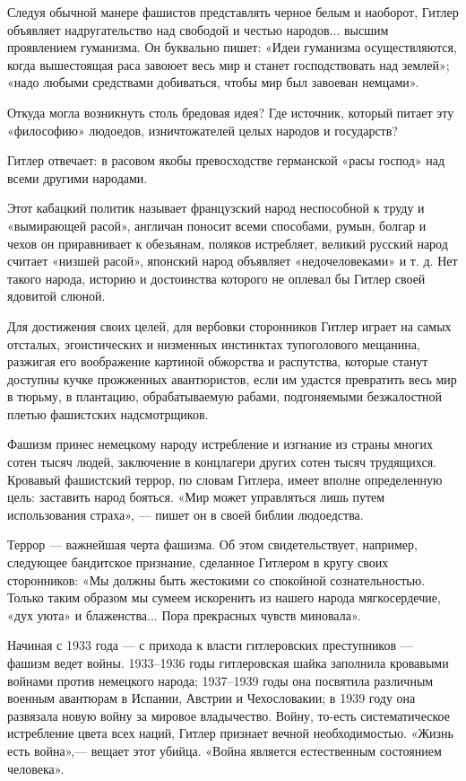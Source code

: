 \documentclass[12pt, a4paper, openany]{book}
\begin{document}
Следуя обычной манере фашистов представлять черное белым и наоборот, Гитлер объявляет надругательство над свободой и честью народов... высшим проявлением гуманизма. Он буквально пишет: «Идеи гуманизма осуществляются, когда вышестоящая раса завоюет весь мир и станет господствовать над землей»; «надо любыми средствами добиваться, чтобы мир был завоеван немцами».

Откуда могла возникнуть столь бредовая идея? Где источник, который питает эту «философию» людоедов, изничтожателей целых народов и государств?

Гитлер отвечает: в расовом якобы превосходстве германской «расы господ» над всеми другими народами.

Этот кабацкий политик называет французский народ неспособной к труду и «вымирающей расой», англичан поносит всеми способами, румын, болгар и чехов он приравнивает к обезьянам, поляков истребляет, великий русский народ считает «низшей расой», японский народ объявляет «недочеловеками» и т. д. Нет такого народа, историю и достоинства которого не оплевал бы Гитлер своей ядовитой слюной.
	
Для достижения своих целей, для вербовки сторонников Гитлер играет на самых отсталых, эгоистических и низменных инстинктах тупоголового мещанина, разжигая его воображение картиной обжорства и распутства, которые станут доступны кучке прожженных авантюристов, если им удастся превратить весь мир в тюрьму, в плантацию, обрабатываемую рабами, подгоняемыми безжалостной плетью фашистских надсмотрщиков.

Фашизм принес немецкому народу истребление и изгнание из страны многих сотен тысяч людей, заключение в концлагери других сотен тысяч трудящихся. Кровавый фашистский террор, по словам Гитлера, имеет вполне определенную цель: заставить народ бояться. «Мир может управляться лишь путем использования страха», — пишет он в своей библии людоедства.

Террор — важнейшая черта фашизма. Об этом свидетельствует, например, следующее бандитское признание, сделанное Гитлером в кругу своих сторонников: «Мы должны быть жестокими со спокойной сознательностью. Только таким образом мы сумеем искоренить из нашего народа мягкосердечие, «дух уюта» и блаженства... Пора прекрасных чувств миновала».

Начиная с 1933 года — с прихода к власти гитлеровских преступников — фашизм ведет войны. 1933–1936 годы гитлеровская шайка заполнила кровавыми войнами против немецкого народа; 1937–1939 годы она посвятила различным военным авантюрам в Испании, Австрии и Чехословакии; в 1939 году она развязала новую войну за мировое владычество. Войну, то-есть систематическое истребление цвета всех наций, Гитлер признает вечной необходимостью. «Жизнь есть война»,— вещает этот убийца. «Война является естественным состоянием человека».
\end{document}
